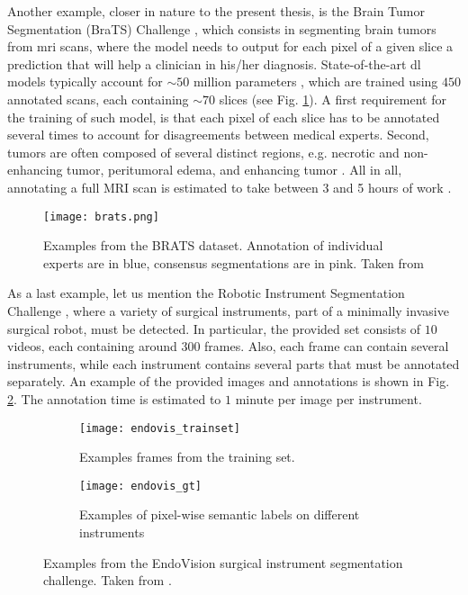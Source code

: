 Another example, closer in nature to the present thesis, is the Brain Tumor Segmentation (BraTS) Challenge \cite{menze15}, which consists in segmenting brain tumors from \gls{mri} scans, where the model needs to output for each pixel of a given slice a prediction that will help a clinician in his/her diagnosis.
State-of-the-art \gls{dl} models typically account for $\sim 50$ million parameters \cite{chen19}, which are trained using $450$ annotated scans, each containing $\sim 70$ slices (see Fig. \ref{fig:brats}).
A first requirement for the training of such model, is that each pixel of each slice has to be annotated several times to account for disagreements between medical experts.
Second, tumors are often composed of several distinct regions, e.g. necrotic and non-enhancing tumor, peritumoral edema, and enhancing tumor \cite{akil20}.
All in all, annotating a full MRI scan is estimated to take between 3 and 5 hours of work \cite{kaus01}.


\begin{figure}[!htpb]
  \texttt{[image: brats.png]}
  \caption{Examples from the BRATS dataset. Annotation of individual experts are in blue, consensus segmentations are in pink. Taken from \cite{menze15}}
  \label{fig:brats}
\end{figure}

As a last example, let us mention the Robotic Instrument Segmentation Challenge \cite{allan19}, where a variety of surgical instruments, part of a minimally invasive surgical robot, must be detected.
In particular, the provided set consists of $10$ videos, each containing around $300$ frames.
Also, each frame can contain several instruments, while each instrument contains several parts that must be annotated separately.
An example of the provided images and annotations is shown in Fig. \ref{fig:intro_endovis}.
The annotation time is estimated to $1$ minute per image per instrument.

\begin{figure}[t!]
    \centering
    \begin{subfigure}[b]{0.5\textwidth}
        \centering
        \texttt{[image: endovis\_trainset]}
        \caption{Examples frames from the training set.}
    \end{subfigure}%
    \begin{subfigure}[b]{0.5\textwidth}
        \centering
        \texttt{[image: endovis\_gt]}
        \caption{Examples of pixel-wise semantic labels on different instruments}
    \end{subfigure}
    \caption{Examples from the EndoVision surgical instrument segmentation challenge. Taken from \cite{allan19}.}
    \label{fig:intro_endovis}
\end{figure}

